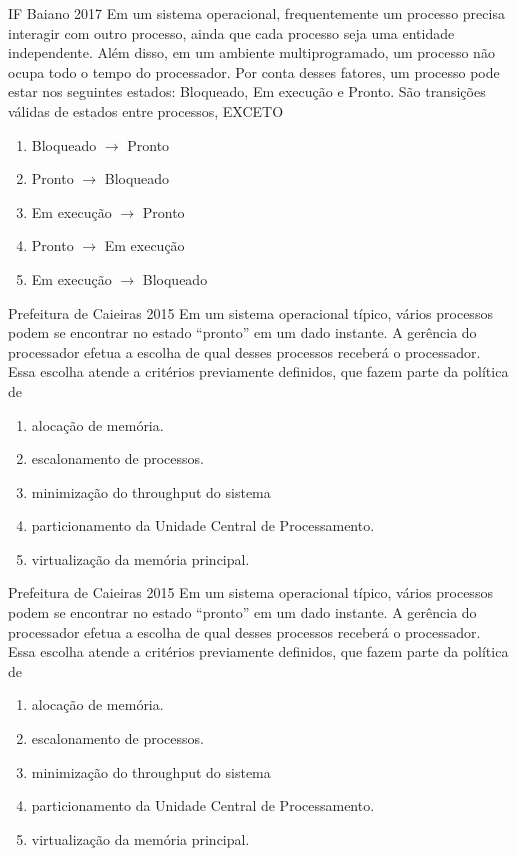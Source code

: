 \documentclass[aspectratio=169,
				xcolor=table]{beamer}
\begin{document}
	\begin{frame}{IF Baiano 2017}
		Em um sistema operacional, frequentemente um processo precisa interagir com outro processo, ainda que cada processo seja uma entidade independente. Além disso, em um ambiente multiprogramado, um processo não ocupa todo o tempo do processador. Por conta desses fatores, um processo pode estar nos seguintes estados: Bloqueado, Em execução e Pronto.
	São transições válidas de estados entre processos, EXCETO
		\begin{enumerate}[a]
			\item Bloqueado $\to$ Pronto
			\item \alert{Pronto $\to$ Bloqueado }
			\item Em execução $\to$ Pronto 
			\item Pronto $\to$ Em execução
			\item Em execução $\to$ Bloqueado			
		\end{enumerate}
	\end{frame}
	
	\begin{frame}{Prefeitura de Caieiras 2015}
		Em um sistema operacional típico, vários processos podem se encontrar no estado “pronto” em um dado instante. A gerência do processador efetua a escolha de qual desses processos receberá o processador. Essa escolha atende a critérios previamente definidos, que fazem parte da política de
		\begin{enumerate}[a]
			\item alocação de memória.
			\item escalonamento de processos.
			\item minimização do throughput do sistema
			\item particionamento da Unidade Central de Processamento.
			\item virtualização da memória principal.		
		\end{enumerate}
	\end{frame}	
	
	\begin{frame}{Prefeitura de Caieiras 2015}
		Em um sistema operacional típico, vários processos podem se encontrar no estado “pronto” em um dado instante. A gerência do processador efetua a escolha de qual desses processos receberá o processador. Essa escolha atende a critérios previamente definidos, que fazem parte da política de
		\begin{enumerate}[a]
			\item alocação de memória.
			\item \alert{escalonamento de processos.}
			\item minimização do throughput do sistema
			\item particionamento da Unidade Central de Processamento.
			\item virtualização da memória principal.		
		\end{enumerate}
	\end{frame}	
	
\end{document}
